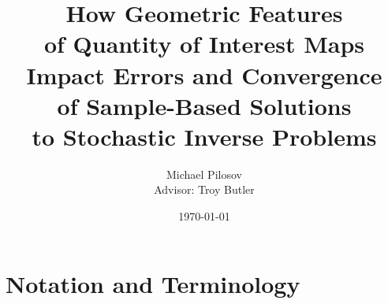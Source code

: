 \documentclass[10pt]{beamer}
\author{Michael Pilosov\\ \vskip 5pt{Advisor: Troy Butler}}%
\title[CG]{How Geometric Features\\of Quantity of Interest Maps\\Impact Errors and Convergence\\of Sample-Based Solutions\\to Stochastic Inverse Problems}
\institute{University of Colorado Denver}
\date{\today}
\begin{document}
\begin{frame}[t,plain]
    \titlepage
\end{frame}


\section{Notation and Terminology}


%
% 
% 









\end{document}

